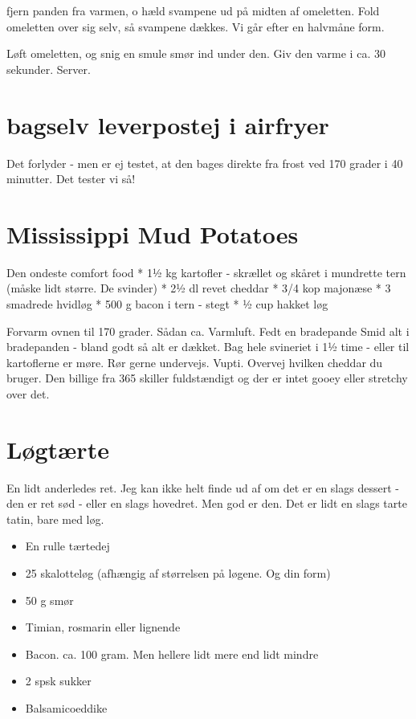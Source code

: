 \documentclass[
]{book}
\providecommand{\tightlist}{%
  \setlength{\itemsep}{0pt}\setlength{\parskip}{0pt}}
\begin{document}
fjern panden fra varmen, o hæld svampene ud på midten af omeletten.
Fold omeletten over sig selv, så svampene dækkes. Vi går efter en halvmåne form.

Løft omeletten, og snig en smule smør ind under den. Giv den varme i ca. 30 sekunder. Server.

\section{bagselv leverpostej i airfryer}\label{bagselv-leverpostej-i-airfryer}

Det forlyder - men er ej testet, at den bages direkte fra
frost ved 170 grader i 40 minutter.
Det tester vi så!

\section{Mississippi Mud Potatoes}\label{mississippi-mud-potatoes}

Den ondeste comfort food
* 1½ kg kartofler - skrællet og skåret i mundrette tern (måske lidt større. De svinder)
* 2½ dl revet cheddar
* 3/4 kop majonæse
* 3 smadrede hvidløg
* 500 g bacon i tern - stegt
* ½ cup hakket løg

Forvarm ovnen til 170 grader. Sådan ca. Varmluft.
Fedt en bradepande
Smid alt i bradepanden - bland godt så alt er dækket.
Bag hele svineriet i 1½ time - eller til kartoflerne er møre.
Rør gerne undervejs.
Vupti. Overvej hvilken cheddar du bruger. Den billige fra 365 skiller
fuldstændigt og der er intet gooey eller stretchy over det.

\section{Løgtærte}\label{luxf8gtuxe6rte}

En lidt anderledes ret. Jeg kan ikke helt finde ud af om det er en slags dessert - den er ret sød - eller en slags hovedret. Men god er den. Det er lidt en slags tarte tatin,
bare med løg.

\begin{itemize}
\tightlist
\item
  En rulle tærtedej
\item
  25 skalotteløg (afhængig af størrelsen på løgene. Og din form)
\item
  50 g smør
\item
  Timian, rosmarin eller lignende
\item
  Bacon. ca. 100 gram. Men hellere lidt mere end lidt mindre
\item
  2 spsk sukker
\item
  Balsamicoeddike
\end{itemize}
\end{document}

